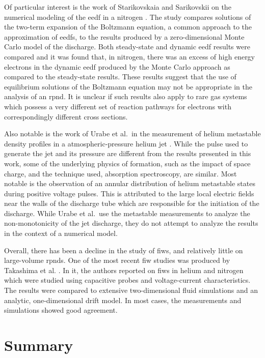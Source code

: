 Of particular interest is the work of Starikovskaia and Sarikovskii on the
numerical modeling of the \acs{eedf} in a nitrogen 
\cite{Starikovskaia2001}. The study compares solutions of the two-term expansion
of the Boltzmann equation, a common approach to the approximation of
\acs{eedf}s, to the results produced by a zero-dimensional Monte Carlo model of
the discharge. Both steady-state and dynamic \acs{eedf} results were compared
and it was found that, in nitrogen, there was an excess of high energy electrons
in the dynamic \acs{eedf} produced by the Monte Carlo approach as compared to
the steady-state results. These results suggest that the use of equilibrium
solutions of the Boltzmann equation may not be appropriate in the analysis of an
\acs{rpnd}. It is unclear if such results also apply to rare gas systems which
possess a very different set of reaction pathways for electrons with
correspondingly different cross sections.

Also notable is the work of Urabe et al.\ in the measurement of helium metastable
density profiles in a atmospheric-pressure helium jet \cite{Urabe2010}. While
the pulse used to generate the jet and its pressure are different from the
results presented in this work, some of the underlying physics of formation,
such as the impact of space charge, and the technique used, absorption
spectroscopy, are similar. Most notable is the observation of an annular
distribution of helium metastable states during positive voltage pulses. This is
attributed to the large local electric fields near the walls of the discharge
tube which are responsible for the initiation of the discharge. While Urabe et
al.\ use the metastable measurements to analyze the non-monotonicity of the jet
discharge, they do not attempt to analyze the results in the context of a
numerical model.

Overall, there has been a decline in the study of \acs{fiw}s, and relatively
little on large-volume \acs{rpnd}s. One of the most recent \acs{fiw} studies was
produced by Takashima et al. \cite{Takashima2011}. In it, the authors reported
on \acs{fiw}s in helium and nitrogen which were studied using capacitive probes
and voltage-current characteristics. The results were compared to extensive
two-dimensional fluid simulations and an analytic, one-dimensional drift model.
In most cases, the measurements and simulations showed good agreement.

\section{Summary}

